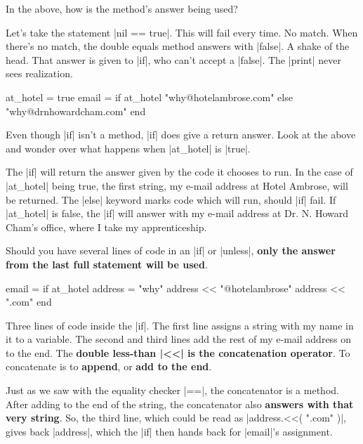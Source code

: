 \documentclass[12pt,twoside]{report}
\begin{document}
In the above, how is the method's answer being used?


Let's take the statement \rubyinline|nil == true|.
This will fail every time.  No match.  When there's no match, the
double equals method answers with \rubyinline|false|.
A shake of the head. That answer is given to
\rubyinline|if|, who can't accept a
\rubyinline|false|.  The
\rubyinline|print| never sees realization.


\begin{rubycode}

 at_hotel = true 
 email = if at_hotel 
           "why@hotelambrose.com" 
         else
           "why@drnhowardcham.com" 
         end

\end{rubycode}


Even though \rubyinline|if| isn't a method,
\rubyinline|if| does give a return answer.  Look at
the above and wonder over what happens when
\rubyinline|at_hotel| is
\rubyinline|true|.

The \rubyinline|if| will return the answer given by
the code it chooses to run.  In the case of
\rubyinline|at_hotel| being true, the first string, my
e-mail address at Hotel Ambrose, will be returned.  The
\rubyinline|else| keyword marks code which will run,
should \rubyinline|if| fail.  If
\rubyinline|at_hotel| is false, the
\rubyinline|if| will answer with my e-mail address at
Dr. N. Howard Cham's office, where I take my apprenticeship.

Should you have several lines of code in an
\rubyinline|if| or
\rubyinline|unless|, {\bf only the answer from the
  last full statement will be used}.


\begin{rubycode}

 email = if at_hotel 
           address = "why" 
           address << "@hotelambrose"
           address << ".com"
         end

\end{rubycode}


Three lines of code inside the \rubyinline|if|.  The
first line assigns a string with my name in it to a variable. The
second and third lines add the rest of my e-mail address on to the
end.  The {\bf double less-than \rubyinline|<<| is the
  concatenation operator}.  To concatenate is to {\bf append}, or {\bf
  add to the end}.

Just as we saw with the equality checker
\rubyinline|==|, the concatenator is a method.  After
adding to the end of the string, the concatenator also {\bf answers
  with that very string}.  So, the third line, which could be read as
\rubyinline|address.<<( ".com" )|, gives back
\rubyinline|address|, which the
\rubyinline|if| then hands back for
\rubyinline|email|'s assignment.
\end{document}
